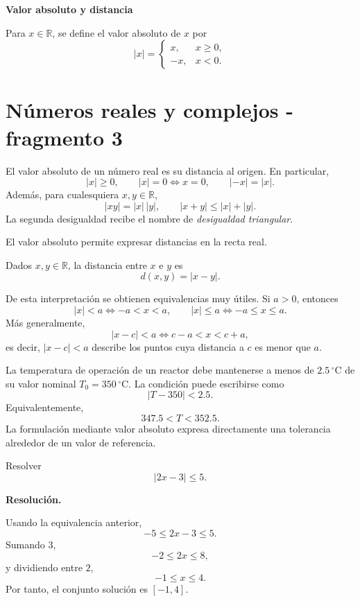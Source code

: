 \textbf{Valor absoluto y distancia}

\begin{definition}
Para \(x\in\mathbb{R}\), se define el valor absoluto de \(x\) por
\[
|x|=
\begin{cases}
 x, & x\geq0,\\
 -x, & x<0.
\end{cases}
\]
\end{definition}


\section{Números reales y complejos - fragmento 3}
El valor absoluto de un número real es su distancia al origen. En particular,
\[
|x|\geq0,
\qquad
|x|=0\Longleftrightarrow x=0,
\qquad
|-x|=|x|.
\]
Además, para cualesquiera \(x,y\in\mathbb{R}\),
\[
|xy|=|x|\,|y|,
\qquad
|x+y|\leq |x|+|y|.
\]
La segunda desigualdad recibe el nombre de \emph{desigualdad triangular}.

El valor absoluto permite expresar distancias en la recta real.

\begin{definition}
Dados \(x,y\in\mathbb{R}\), la distancia entre \(x\) e \(y\) es
\[
d(x,y)=|x-y|.
\]
\end{definition}

De esta interpretación se obtienen equivalencias muy útiles. Si \(a>0\), entonces
\[
|x|<a\Longleftrightarrow -a<x<a,
\qquad
|x|\leq a\Longleftrightarrow -a\leq x\leq a.
\]
Más generalmente,
\[
|x-c|<a\Longleftrightarrow c-a<x<c+a,
\]
es decir, \(|x-c|<a\) describe los puntos cuya distancia a \(c\) es menor que \(a\).

\begin{example}
La temperatura de operación de un reactor debe mantenerse a menos de \(2.5\,^{\circ}\mathrm{C}\) de su valor nominal \(T_0=350\,^{\circ}\mathrm{C}\). La condición puede escribirse como
\[
|T-350|<2.5.
\]
Equivalentemente,
\[
347.5<T<352.5.
\]
La formulación mediante valor absoluto expresa directamente una tolerancia alrededor de un valor de referencia.
\end{example}

\begin{solvedexercise}
Resolver
\[
|2x-3|\leq5.
\]

\textbf{Resolución.}\par\smallskip
Usando la equivalencia anterior,
\[
-5\leq2x-3\leq5.
\]
Sumando \(3\),
\[
-2\leq2x\leq8,
\]
y dividiendo entre \(2\),
\[
-1\leq x\leq4.
\]
Por tanto, el conjunto solución es \([-1,4]\).
\end{solvedexercise}

